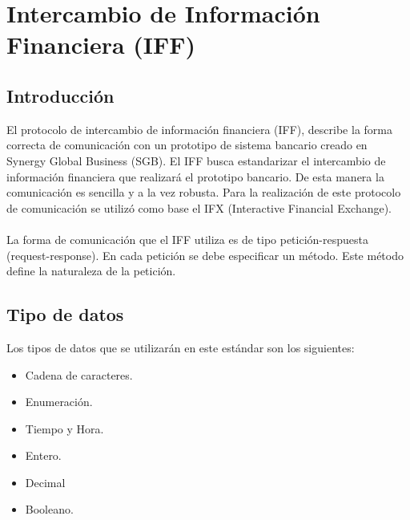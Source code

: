 %
\chapter{Intercambio de Información Financiera (IFF)}

\section*{Introducción}

El protocolo de intercambio de información financiera (IFF), describe la forma correcta de comunicación con un prototipo de sistema bancario creado en Synergy Global Business (SGB). El IFF busca estandarizar el intercambio de información financiera que realizará el prototipo bancario. De esta manera la comunicación es sencilla y a la vez robusta. Para la realización de este protocolo de comunicación se utilizó como base el IFX (Interactive Financial Exchange).
\\
\\ 
La forma de comunicación que el IFF	utiliza es de tipo petición-respuesta (request-response). En cada petición se debe especificar un método. Este método define la naturaleza de la petición.

\section{Tipo de datos}

Los tipos de datos que se utilizarán en este estándar son los siguientes:
\begin{itemize}
\item Cadena de caracteres.
\item Enumeración.
\item Tiempo y Hora.
\item Entero.
\item Decimal
\item Booleano.
\end{itemize}

